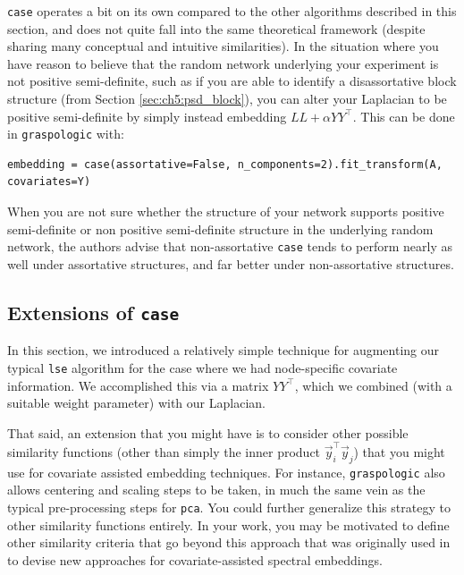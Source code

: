\texttt{case} operates a bit on its own compared to the other algorithms described in this section, and does not quite fall into the same theoretical framework (despite sharing many conceptual and intuitive similarities). In the situation where you have reason to believe that the random network underlying your experiment is not positive semi-definite, such as if you are able to identify a disassortative block structure (from Section \ref{sec:ch5:psd_block}), you can alter your Laplacian to be positive semi-definite by simply instead embedding $LL + \alpha YY^\top$. This can be done in \texttt{graspologic} with:

\begin{lstlisting}[style=python]
embedding = case(assortative=False, n_components=2).fit_transform(A, covariates=Y)
\end{lstlisting}

When you are not sure whether the structure of your network supports positive semi-definite or non positive semi-definite structure in the underlying random network, the authors advise \cite{Binkiewicz2017Jun} that non-assortative \texttt{case} tends to perform nearly as well under assortative structures, and far better under non-assortative structures.

\subsection{Extensions of \texttt{case}}

In this section, we introduced a relatively simple technique for augmenting our typical \texttt{lse} algorithm for the case where we had node-specific covariate information. We accomplished this via a matrix $YY^\top$, which we combined (with a suitable weight parameter) with our Laplacian.

That said, an extension that you might have is to consider other possible similarity functions (other than simply the inner product $\vec y_i^\top \vec y_j$) that you might use for covariate assisted embedding techniques. For instance, \texttt{graspologic} also allows centering and scaling steps to be taken, in much the same vein as the typical pre-processing steps for \texttt{pca}. You could further generalize this strategy to other similarity functions entirely. In your work, you may be motivated to define other similarity criteria that go beyond this approach that was originally used in \cite{Binkiewicz2017Jun} to devise new approaches for covariate-assisted spectral embeddings.


\newpage